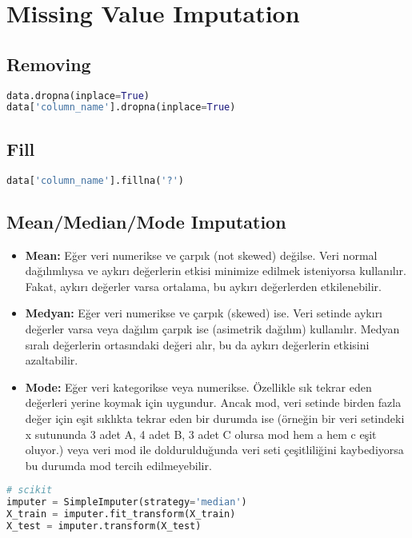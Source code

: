\section{Missing Value Imputation}

\subsection{Removing}

\begin{lstlisting}[language=Python]
data.dropna(inplace=True)
data['column_name'].dropna(inplace=True)
\end{lstlisting}

\subsection{Fill}

\begin{lstlisting}[language=Python]
data['column_name'].fillna('?')
\end{lstlisting}

\subsection{Mean/Median/Mode Imputation}

\begin{itemize}
    \item \textbf{Mean:} Eğer veri numerikse ve çarpık (not skewed) değilse. Veri normal dağılımlıysa ve aykırı değerlerin etkisi minimize edilmek isteniyorsa kullanılır. Fakat, aykırı değerler varsa ortalama, bu aykırı değerlerden etkilenebilir.
    \item \textbf{Medyan:} Eğer veri numerikse ve çarpık (skewed) ise. Veri setinde aykırı değerler varsa veya dağılım çarpık ise (asimetrik dağılım) kullanılır. Medyan sıralı değerlerin ortasındaki değeri alır, bu da aykırı değerlerin etkisini azaltabilir.
    \item \textbf{Mode:} Eğer veri kategorikse veya numerikse. Özellikle sık tekrar eden değerleri yerine koymak için uygundur. Ancak mod, veri setinde birden fazla değer için eşit sıklıkta tekrar eden bir durumda ise (örneğin bir veri setindeki x sutununda 3 adet A, 4 adet B, 3 adet C olursa mod hem a hem c eşit oluyor.) veya veri mod ile doldurulduğunda veri seti çeşitliliğini kaybediyorsa bu durumda mod tercih edilmeyebilir.
\end{itemize}

\begin{lstlisting}[language=Python]
# scikit
imputer = SimpleImputer(strategy='median')
X_train = imputer.fit_transform(X_train)
X_test = imputer.transform(X_test)
\end{lstlisting}

